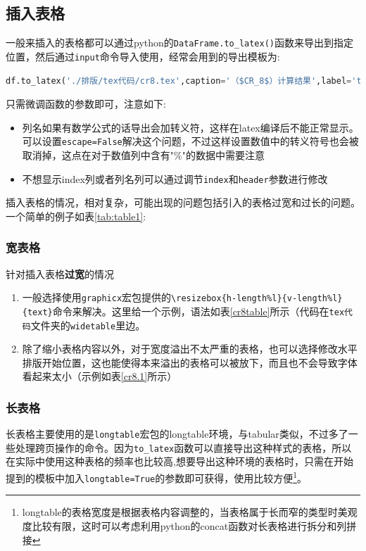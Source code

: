 \documentclass[withoutpreface,bwprint]{cumcmthesis} %
\begin{document}
\subsection{插入表格}
一般来插入的表格都可以通过python的\verb|DataFrame.to_latex()|函数来导出到指定位置，然后通过\verb|input|命令导入使用，经常会用到的导出模板为:
\begin{lstlisting}[language=python]
df.to_latex('./排版/tex代码/cr8.tex',caption='（$CR_8$）计算结果',label='table',header=False)
\end{lstlisting}
只需微调函数的参数即可，注意如下:
\begin{itemize}
  \item 列名如果有数学公式的话导出会加转义符，这样在latex编译后不能正常显示。可以设置\verb|escape=False|解决这个问题，不过这样设置数值中的转义符号也会被取消掉，这点在对于数值列中含有"\%"的数据中需要注意
  \item 不想显示index列或者列名列可以通过调节\verb|index|和\verb|header|参数进行修改
\end{itemize}

插入表格的情况，相对复杂，可能出现的问题包括引入的表格过宽和过长的问题。
一个简单的例子如表\ref{tab:table1}:
{}
\subsubsection{宽表格}
针对插入表格\textbf{过宽}的情况
\begin{enumerate}
  \item 一般选择使用\verb|graphicx|宏包提供的\verb|\resizebox{h-length%l}{v-length%l}{text}|命令来解决。这里给一个示例，语法如表\ref{cr8table}所示（代码在\verb|tex代码|文件夹的\verb|widetable|里边。
        {
        
        }
  \item 除了缩小表格内容以外，对于宽度溢出不太严重的表格，也可以选择修改水平排版开始位置，这也能使得本来溢出的表格可以被放下，而且也不会导致字体看起来太小（示例如表\ref{cr8.1}所示）
        {
        
        }
\end{enumerate}
\subsubsection{长表格}
长表格主要使用的是\verb|longtable|宏包的longtable环境，与tabular类似，不过多了一些处理跨页操作的命令。因为\verb|to_latex|函数可以直接导出这种样式的表格，所以在实际中使用这种表格的频率也比较高,想要导出这种环境的表格时，只需在开始提到的模板中加入\verb|longtable=True|的参数即可获得，使用比较方便\footnote{longtable的表格宽度是根据表格内容调整的，当表格属于长而窄的类型时美观度比较有限，这时可以考虑利用python的concat函数对长表格进行拆分和列拼接}。\par
\end{document}
